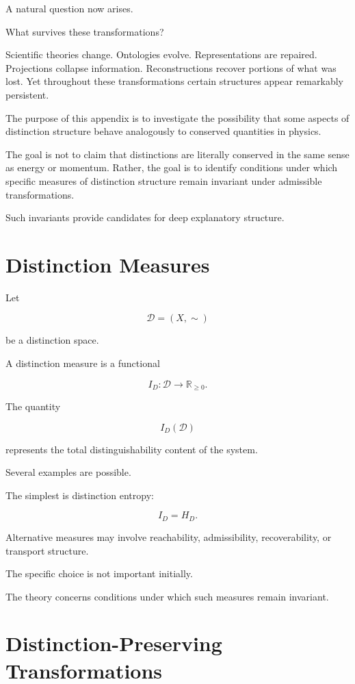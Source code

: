\documentclass[11pt,oneside,openany]{book}
\begin{document}
A natural question now arises.

What survives these transformations?

Scientific theories change. Ontologies evolve. Representations are repaired. Projections collapse information. Reconstructions recover portions of what was lost. Yet throughout these transformations certain structures appear remarkably persistent.

The purpose of this appendix is to investigate the possibility that some aspects of distinction structure behave analogously to conserved quantities in physics.

The goal is not to claim that distinctions are literally conserved in the same sense as energy or momentum. Rather, the goal is to identify conditions under which specific measures of distinction structure remain invariant under admissible transformations.

Such invariants provide candidates for deep explanatory structure.

\section{Distinction Measures}

Let

\[
\mathcal D=(X,\sim)
\]

be a distinction space.

A distinction measure is a functional

\[
I_D:\mathcal D\rightarrow\mathbb R_{\ge0}.
\]

The quantity

\[
I_D(\mathcal D)
\]

represents the total distinguishability content of the system.

Several examples are possible.

The simplest is distinction entropy:

\[
I_D
=
H_D.
\]

Alternative measures may involve reachability, admissibility, recoverability, or transport structure.

The specific choice is not important initially.

The theory concerns conditions under which such measures remain invariant.

\section{Distinction-Preserving Transformations}
\end{document}
